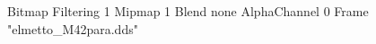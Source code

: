 {Bitmap
	{Filtering 1}
	{Mipmap 1}
	{Blend none}
	{AlphaChannel 0}
	{Frame "elmetto_M42para.dds"}
}
